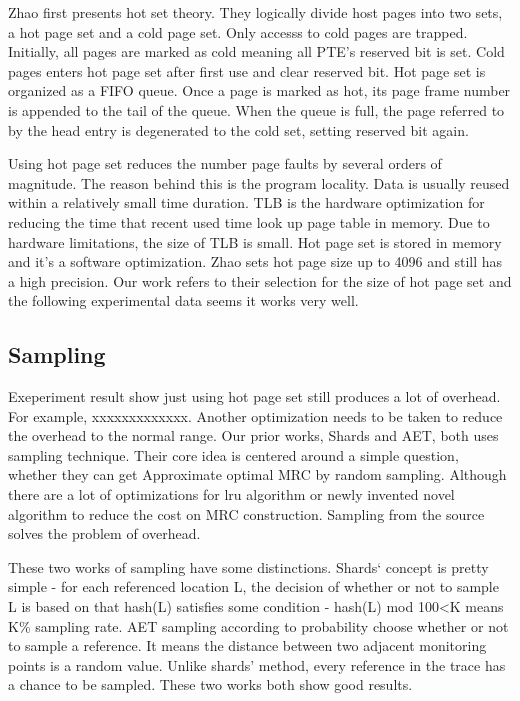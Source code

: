 \documentclass[10pt,twocolumn]{article}
\begin{document}
Zhao\cite{Zhao2009Dynamic} first presents hot set theory. They logically divide host pages into two sets, a hot page set and a cold page set. Only accesss to cold pages are trapped. Initially, all pages are marked as cold meaning all PTE's reserved bit is set. Cold pages enters hot page set after first use and clear reserved bit. Hot page set is organized as a FIFO queue. Once a page is marked as hot, its page frame number is appended to the tail of the queue. When the queue is full, the page referred to by the head entry is degenerated to the cold set, setting reserved bit again.

Using hot page set reduces the number page faults by several orders of magnitude. The reason behind this is the program locality. Data is usually reused within a relatively small time duration. TLB is the hardware optimization for reducing the time that recent used time look up page table in memory. Due to hardware limitations, the size of TLB is small. Hot page set is stored in memory and it's a software optimization. Zhao\cite{Zhao2009Dynamic} sets hot page size up to 4096 and still has a high precision. Our work refers to their selection for the size of hot page set and the following experimental data seems it works very well.

\subsection{Sampling}
Exeperiment result show just using hot page set still produces a lot of overhead. For example, xxxxxxxxxxxxx. Another optimization needs to be taken to reduce the overhead to the normal range. Our prior works, Shards\cite{shards} and AET\cite{aet}, both uses sampling technique. Their core idea is centered around a simple question, whether they can get Approximate optimal MRC by random sampling. Although there are a lot of optimizations for lru algorithm or newly invented novel algorithm to reduce the cost on MRC construction. Sampling from the source solves the problem of overhead.

These two works of sampling have some distinctions. Shards‘ concept is pretty simple - for each referenced location L, the decision of whether or not to sample L is based on that hash(L) satisfies some condition - hash(L) mod 100\textless K means K\% sampling rate. AET sampling according to probability choose whether or not to sample a reference. It means the distance between two adjacent monitoring points is a random value. Unlike shards' method, every reference in the trace has a chance to be sampled. These two works both show good results.
\end{document}
